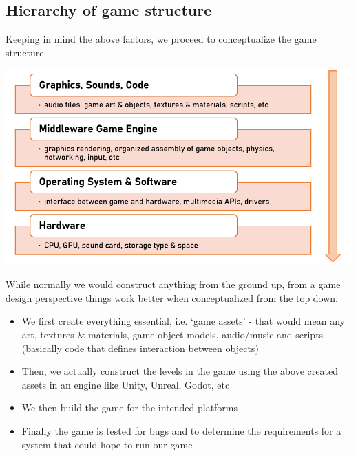\documentclass{article}[a4paper,12pt]
\theoremstyle{definition}
\begin{document}
\subsection{Hierarchy of game structure}
Keeping in mind the above factors, we proceed to conceptualize the game structure.
\begin{center}\includegraphics[scale=0.8]{game_design_hierarchy.png}\end{center}

While normally we would construct anything from the ground up, from a game design perspective things work better when conceptualized from the top down. 
\begin{itemize}
	\item We first create everything essential, i.e. `game assets' - that would mean any art, textures \& materials, game object models, audio/music and scripts (basically code that defines interaction between objects)
	\item Then, we actually construct the levels in the game using the above created assets in an engine like Unity, Unreal, Godot, etc
	\item We then build the game for the intended platforms
	\item Finally the game is tested for bugs and to determine the requirements for a system that could hope to run our game
\end{itemize}
\end{document}
